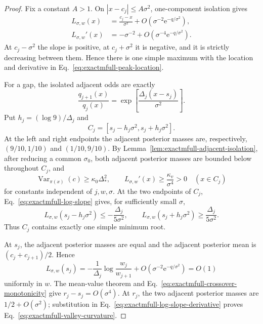 \documentclass[aps,physrev,onecolumn,amsmath,amssymb,longbibliography]{revtex4-2}
\newcommand{\e}{\mathrm e}
\begin{document}
\begin{proof}
Fix a constant \(A>1\).  On
\(|x-c_j|\le A\sigma^2\), one-component isolation gives
\begin{align}
 L_{\sigma,w}(x)
 &=\frac{c_j-x}{\sigma^2}
   +O(\sigma^{-2}\e^{-q/\sigma^2}),
 \label{eq:exactmfull-peak-slope-expansion}\\
 L_{\sigma,w}'(x)
 &=-\sigma^{-2}
   +O(\sigma^{-4}\e^{-q/\sigma^2}).
 \label{eq:exactmfull-peak-derivative-expansion}
\end{align}
At \(c_j-\sigma^2\) the slope is positive, at
\(c_j+\sigma^2\) it is negative, and it is strictly decreasing between
them.  Hence there is one simple maximum with the location and derivative in
Eq.~\eqref{eq:exactmfull-peak-location}.

For a gap, the isolated adjacent odds are exactly
\begin{equation}
 \frac{q_{j+1}(x)}{q_j(x)}
 =\exp\!\left[\frac{\Delta_j(x-s_j)}{\sigma^2}\right].
 \label{eq:exactmfull-adjacent-odds}
\end{equation}
Put \(h_j=(\log9)/\Delta_j\) and
\begin{equation}
 C_j=[s_j-h_j\sigma^2,s_j+h_j\sigma^2].
 \label{eq:exactmfull-crossover-interval}
\end{equation}
At the left and right endpoints the adjacent posterior masses are,
respectively, \((9/10,1/10)\) and \((1/10,9/10)\).  By
Lemma~\ref{lem:exactmfull-adjacent-isolation}, after reducing a common
\(\sigma_0\), both adjacent posterior masses are bounded below throughout
\(C_j\), and
\begin{equation}
 \operatorname{Var}_{\pi(x)}(c)\ge\kappa_0\Delta_*^2,
 \qquad
 L_{\sigma,w}'(x)\ge\frac{\kappa_v}{\sigma^4}>0
 \quad(x\in C_j)
 \label{eq:exactmfull-crossover-monotonicity}
\end{equation}
for constants independent of \(j,w,\sigma\).  At the two endpoints of
\(C_j\), Eq.~\eqref{eq:exactmfull-log-slope} gives, for sufficiently small
\(\sigma\),
\begin{equation}
 L_{\sigma,w}(s_j-h_j\sigma^2)
 \le-\frac{\Delta_j}{5\sigma^2},
 \qquad
 L_{\sigma,w}(s_j+h_j\sigma^2)
 \ge \frac{\Delta_j}{5\sigma^2}.
 \label{eq:exactmfull-crossover-signs}
\end{equation}
Thus \(C_j\) contains exactly one simple minimum root.

At \(s_j\), the adjacent posterior masses are equal and the adjacent
posterior mean is \((c_j+c_{j+1})/2\).  Hence
\begin{equation}
 L_{\sigma,w}(s_j)
 =-\frac{1}{\Delta_j}\log\frac{w_j}{w_{j+1}}
 +O(\sigma^{-2}\e^{-q/\sigma^2})=O(1)
 \label{eq:exactmfull-slope-at-crossover}
\end{equation}
uniformly in \(w\).  The mean-value theorem and
Eq.~\eqref{eq:exactmfull-crossover-monotonicity} give
\(r_j-s_j=O(\sigma^4)\).  At \(r_j\), the two adjacent posterior masses are
\(1/2+O(\sigma^2)\); substitution in
Eq.~\eqref{eq:exactmfull-log-slope-derivative} proves
Eq.~\eqref{eq:exactmfull-valley-curvature}.


\end{proof}
\end{document}
